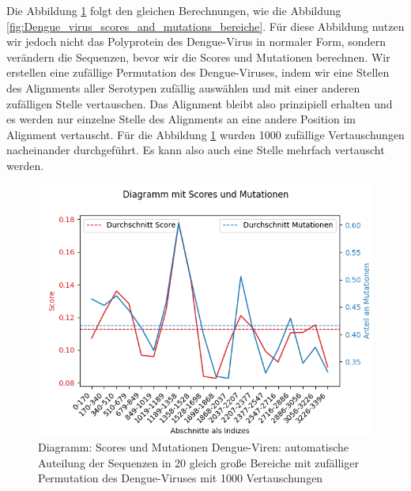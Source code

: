 \documentclass[german,version-2022-01]{uzl-thesis}
\begin{document}
Die Abbildung \ref{fig:Dengue_virus_scores_and_mutations_bereiche_random} folgt den gleichen Berechnungen, wie die Abbildung \ref{fig:Dengue_virus_scores_and_mutations_bereiche}. F\"ur diese Abbildung nutzen wir jedoch nicht das Polyprotein des Dengue-Virus in normaler Form, sondern ver\"andern die Sequenzen, bevor wir die Scores und Mutationen berechnen. Wir erstellen eine zuf\"allige Permutation des Dengue-Viruses, indem wir eine Stellen des Alignments aller Serotypen zuf\"allig ausw\"ahlen und mit einer anderen zuf\"alligen Stelle vertauschen. Das Alignment bleibt also prinzipiell erhalten und es werden nur einzelne Stelle des Alignments an eine andere Position im Alignment vertauscht. F\"ur die Abbildung \ref{fig:Dengue_virus_scores_and_mutations_bereiche_random} wurden 1000 zuf\"allige Vertauschungen nacheinander durchgef\"uhrt. Es kann also auch eine Stelle mehrfach vertauscht werden. 
\begin{figure}[htpb]
  \centering
  \includegraphics[scale=0.75]{Images/Diagramm_Scores_und_Mutationen_Dengue_viren_Bereiche_random.png}
  \caption{Diagramm: Scores und Mutationen Dengue-Viren: automatische Auteilung der Sequenzen in 20 gleich gro\ss{}e Bereiche mit zuf\"alliger Permutation des Dengue-Viruses mit 1000 Vertauschungen}
  \label{fig:Dengue_virus_scores_and_mutations_bereiche_random}
\end{figure}
\end{document}
